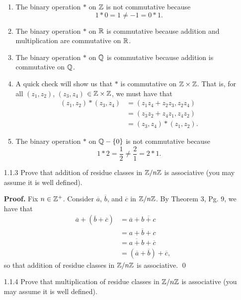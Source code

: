 \begin{enumerate}
      \begin{enumerate}      
         \item The binary operation $*$ on $\mathbb{Z}$ is not commutative because
               $$1 * 0 = 1 \neq -1 = 0 * 1.$$
         \item The binary operation $*$ on $\mathbb{R}$ is commutative because addition
               and multiplication are commutative on $\mathbb{R}$.
         \item The binary operation $*$ on $\mathbb{Q}$ is commutative because addition
               is commutative on $\mathbb{Q}$.
         \item A quick check will show us that $*$ is commutative on
               $\mathbb{Z} \times \mathbb{Z}$. That is, for all $(z_1, z_2)$, $(z_3, z_4)$
               $\in \mathbb{Z} \times \mathbb{Z}$, we must have that
               \begin{align*}
                  (z_1, z_2) * (z_3, z_4) &= (z_1z_4 + z_2z_3, z_2z_4) \\
                                          &= (z_3z_2 + z_4z_1, z_4z_2) \\
                                          &= (z_3, z_4) * (z_1, z_2).
               \end{align*}
         \item The binary operation $*$ on $\mathbb{Q} - \{0\}$ is not commutative
               because
               $$1 * 2 = \frac{1}{2} \neq \frac{2}{1} = 2 * 1.$$
      \end{enumerate}
   \item[1.1.3]   Prove that addition of residue classes in $\mathbb{Z}/n\mathbb{Z}$ is
                  associative (you may assume it is well defined).
                  
      \textbf{Proof.} Fix $n \in \mathbb{Z}^+$. Consider $\overline{a}$, $\overline{b}$,
      and $\overline{c}$ in $\mathbb{Z}/n\mathbb{Z}$. By Theorem 3, Pg. 9, we have that
      \begin{align*}
         \overline{a} + (\overline{b} + \overline{c})
            &= \overline{a} + \overline{b + c} \\
            &= \overline{a + b + c} \\
            &= \overline{a + b} + \overline{c} \\
            &= (\overline{a} + \overline{b}) + \overline{c},
      \end{align*}
      so that addition of residue classes in $\mathbb{Z}/n\mathbb{Z}$ is associative. \qed
   \item[1.1.4]   Prove that multiplication of residue classes in $\mathbb{Z}/n\mathbb{Z}$ is
                  associative (you may assume it is well defined).
                  

\end{enumerate}
